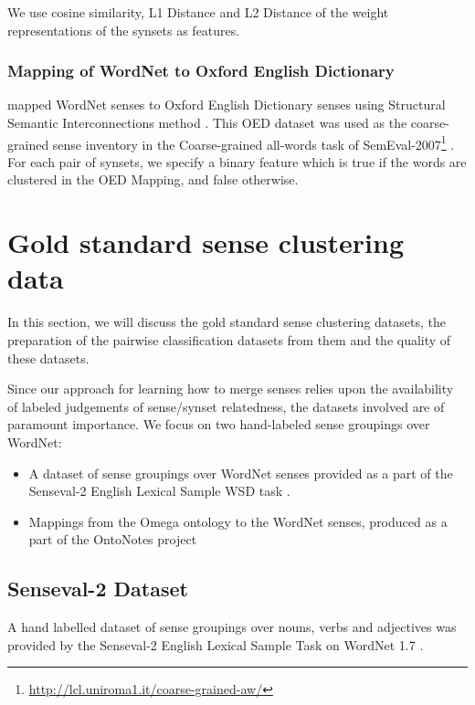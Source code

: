 We use cosine similarity, L1 Distance and L2 Distance of the weight representations of the synsets as features.


\subsubsection{Mapping of WordNet to Oxford English Dictionary} 
\citep{Navigli06meaningfulclustering} mapped WordNet senses to Oxford English Dictionary senses using Structural Semantic Interconnections method \citep{Navigli05SSI}. This OED dataset was used as the coarse-grained sense inventory in the Coarse-grained all-words task of SemEval-2007\footnote{\url{http://lcl.uniroma1.it/coarse-grained-aw/}} \citep{navigli-litkowski:SemEval-2007}.
For each pair of synsets, we specify a binary feature which is true if the words are clustered in the OED Mapping, and false otherwise.

\section{Gold standard sense clustering data}
\label{section:goldStandardDatasets}
In this section, we will discuss the gold standard sense clustering datasets, the preparation of the pairwise classification datasets from them and the quality of these datasets.

Since our approach for learning how to merge senses relies upon the availability of labeled judgements of sense/synset relatedness, the datasets involved are of paramount importance. 
We focus on two hand-labeled sense groupings over WordNet:
\begin{itemize}
\item A dataset of sense groupings over WordNet senses provided as a part of the Senseval-2 English Lexical Sample WSD task \citep{Senseval2LexicalSampleTask}.
\item Mappings from the Omega ontology \citep{philpot2005omega} to the WordNet senses, produced as a part of the OntoNotes project \citep{Hovy:2006}
\end{itemize}

\subsection{Senseval-2 Dataset}
A hand labelled dataset of sense groupings over nouns, verbs and adjectives was provided by the Senseval-2 English Lexical Sample Task on WordNet 1.7 \citep{Senseval2LexicalSampleTask} \citep{Edmonds:2001}. 

